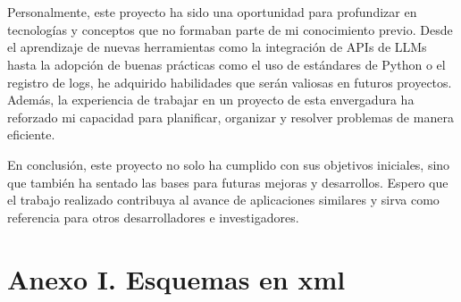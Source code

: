 \chapter*{}
Personalmente, este proyecto ha sido una oportunidad para profundizar en tecnologías y conceptos que no formaban parte de mi conocimiento previo. Desde el aprendizaje de nuevas herramientas como la integración de APIs de LLMs hasta la adopción de buenas prácticas como el uso de estándares de Python o el registro de logs, he adquirido habilidades que serán valiosas en futuros proyectos. Además, la experiencia de trabajar en un proyecto de esta envergadura ha reforzado mi capacidad para planificar, organizar y resolver problemas de manera eficiente.

En conclusión, este proyecto no solo ha cumplido con sus objetivos iniciales, sino que también ha sentado las bases para futuras mejoras y desarrollos. Espero que el trabajo realizado contribuya al avance de aplicaciones similares y sirva como referencia para otros desarrolladores e investigadores.

\newpage
\printbibliography

%
%


\appendix
\chapter{Anexo I. Esquemas en xml}



